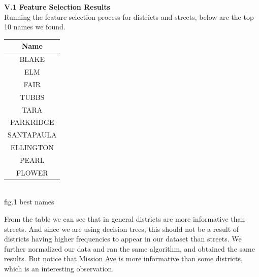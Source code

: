 \documentclass[12pt]{article}
\newenvironment{p4}[2][Part V Results and Evaluation]{\begin{trivlist}
\item[\hskip \labelsep {\bfseries #1}\hskip \labelsep {\bfseries #2}]}{\end{trivlist}}
\begin{document}
\begin{p4}{}
\item{\textbf{V.1 Feature Selection Results}\\}
Running the feature selection process for districts and streets, below are the top 10 names we found.
\begin{center}
	\begin{tabular}{||c||} 
		\hline
	   	Name \\
		\hline
		BLAKE\\
		\hline
		ELM \\
		\hline
		FAIR\\
		\hline
		TUBBS\\
		\hline
		TARA\\
		\hline
		PARKRIDGE\\
		\hline
		SANTAPAULA\\
		\hline
		ELLINGTON\\
		\hline
		PEARL\\
		\hline
		FLOWER\\
		\hline
	\end{tabular}
	{\\fig.1 best names}
\end{center}
From the table we can see that in general districts are more informative than streets. And since we are using decision trees, this should not be a result of districts having higher frequencies to appear in our dataset than streets. We further normalized our data and ran the same algorithm, and obtained the same results. But notice that Mission Ave is more informative than some districts, which is an interesting observation.\\


\end{p4}
\end{document}
